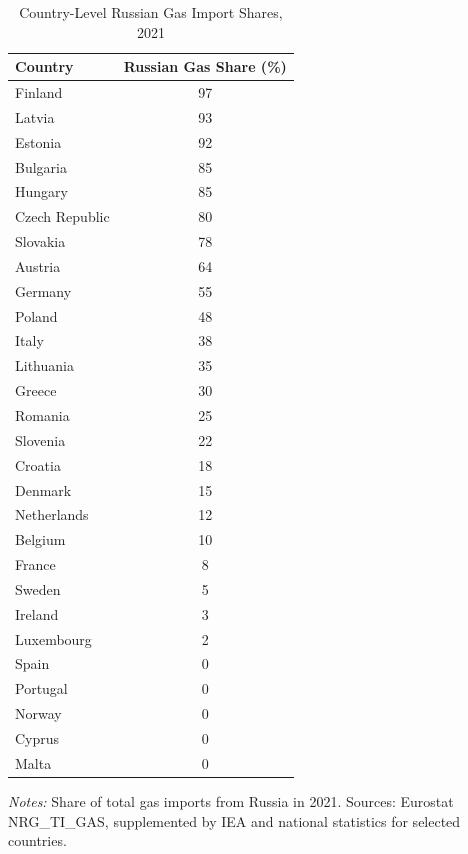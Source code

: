 \documentclass[12pt]{article}
\begin{document}
\begin{table}[htbp]
\centering
\caption{Country-Level Russian Gas Import Shares, 2021}
\label{tab:gas_shares}
\begin{tabular}{lc}
\hline\hline
Country & Russian Gas Share (\%) \\
\hline
Finland & 97 \\
Latvia & 93 \\
Estonia & 92 \\
Bulgaria & 85 \\
Hungary & 85 \\
Czech Republic & 80 \\
Slovakia & 78 \\
Austria & 64 \\
Germany & 55 \\
Poland & 48 \\
Italy & 38 \\
Lithuania & 35 \\
Greece & 30 \\
Romania & 25 \\
Slovenia & 22 \\
Croatia & 18 \\
Denmark & 15 \\
Netherlands & 12 \\
Belgium & 10 \\
France & 8 \\
Sweden & 5 \\
Ireland & 3 \\
Luxembourg & 2 \\
Spain & 0 \\
Portugal & 0 \\
Norway & 0 \\
Cyprus & 0 \\
Malta & 0 \\
\hline\hline
\end{tabular}
\begin{minipage}{0.7\textwidth}
\footnotesize
\textit{Notes:} Share of total gas imports from Russia in 2021. Sources: Eurostat NRG\_TI\_GAS, supplemented by IEA and national statistics for selected countries.
\end{minipage}
\end{table}
\end{document}
